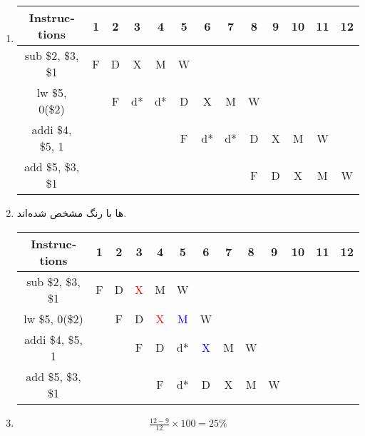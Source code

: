 \begin{enumerate}
    \item \phantom{a}
    \begin{latin}
    \centering
    \begin{tabular}{|c|c|c|c|c|c|c|c|c|c|c|c|c|}
        \hline
        Instructions & 1 & 2 & 3 & 4 & 5 & 6 & 7 & 8 & 9 & 10 & 11 & 12\\
        \hline
        sub \$2, \$3, \$1 & F & D & X  & M  & W &    &    &   &   &   &   &   \\
        \hline
        lw \$5, 0(\$2)    &   & F & d* & d* & D & X  & M  & W &   &   &   &   \\
        \hline
        addi \$4, \$5, 1  &   &   &    &    & F & d* & d* & D & X & M & W &   \\
        \hline
        add \$5, \$3, \$1 &   &   &    &    &   &    &    & F & D & X & M & W \\
        \hline
    \end{tabular}
    \end{latin}
    \item {}ها با رنگ مشخص شده‌اند.
    \begin{latin}
    \centering
    \begin{tabular}{|c|c|c|c|c|c|c|c|c|c|c|c|c|}
        \hline
        Instructions & 1 & 2 & 3 & 4 & 5 & 6 & 7 & 8 & 9 & 10 & 11 & 12\\
        \hline
        sub \$2, \$3, \$1 & F & D & \textcolor{red}{X} & M & W  &   &   &   &   &   &   &   \\
        \hline
        lw \$5, 0(\$2)    &   & F & D & \textcolor{red}{X} & \textcolor{blue}{M} & W &   &   &   &   &   &   \\
        \hline
        addi \$4, \$5, 1  &   &   & F & D & d* & \textcolor{blue}{X} & M & W &   &   &   &   \\
        \hline
        add \$5, \$3, \$1 &   &   &   & F & d* & D & X & M & W &   &   &   \\
        \hline
    \end{tabular}
    \end{latin}
    \item \begin{gather*}
        \frac{12-9}{12} \times 100 = 25\%
    \end{gather*}
\end{enumerate}